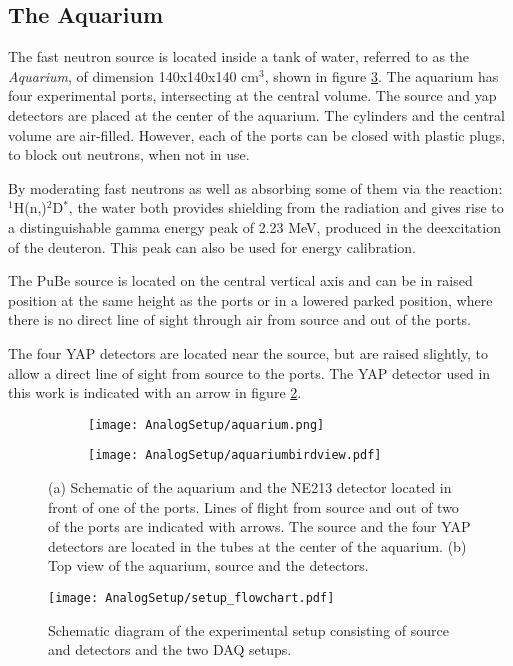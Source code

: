\documentclass[main.tex]{subfiles}
\begin{document}
\subsection{The Aquarium}
The fast neutron source is located inside a tank of water, referred to as the \textit{Aquarium}, of dimension 140x140x140 \si{\cm}${}^\text{3}$, shown in figure \ref{fig:aquarium}. The aquarium has four experimental ports, intersecting at the central volume. The source and yap detectors are placed at the center of the aquarium. The cylinders and the central volume are air-filled. However, each of the ports can be closed with plastic plugs, to block out neutrons, when not in use.

By moderating fast neutrons as well as absorbing some of them via the reaction: $^{\text{1}}$H(n,\textgamma)$^{\text{2}}$D$^*$, the water both provides shielding from the radiation and gives rise to a distinguishable gamma energy peak of 2.23 MeV, produced in the deexcitation of the deuteron. This peak can also be used for energy calibration.

The PuBe source is located on the central vertical axis and can be in raised position at the same height as the ports or in a lowered parked position, where there is no direct line of sight through air from source and out of the ports.

The four YAP detectors are located near the source, but are raised slightly, to allow a direct line of sight from source to the ports. The YAP detector used in this work is indicated with an arrow in figure \ref{fig:aquarium_bird}.
\begin{figure}[ht]
	\center
	\begin{subfigure}[b]{0.39\textwidth}
	    \centering
    	    \texttt{[image: AnalogSetup/aquarium.png]}
        	\caption[Aquarium 3D]{}
	    \label{fig:aquarium_pers} 
	\end{subfigure}
	\begin{subfigure}[b]{0.6\textwidth}
	    \centering
    	    \texttt{[image: AnalogSetup/aquariumbirdview.pdf]}
        	\caption[Aquarium 2D, top view]{}
	    \label{fig:aquarium_bird} 
	\end{subfigure}
	\caption[CAD drawing of the aquarium]{(a) Schematic of the aquarium and the NE213 detector located in front of one of the ports. Lines of flight from source and out of two of the ports are indicated with arrows. The source and the four YAP detectors are located in the tubes at the center of the aquarium. (b) Top view of the aquarium, source and the detectors.}
	\label{fig:aquarium}
\end{figure}
\begin{figure}[h]
    \centering
        \texttt{[image: AnalogSetup/setup\_flowchart.pdf]}
        \caption[Diagram of experimental setup]{Schematic diagram of the experimental setup consisting of source and detectors and the two DAQ setups.}
    \label{fig:setup}
\end{figure}
\end{document}

